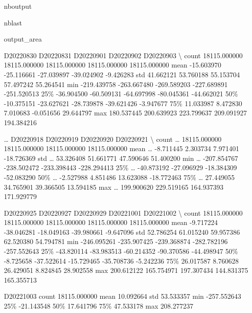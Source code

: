 \documentclass[letterpaper,10pt]{sphinxmanual}
\begin{document}
\begin{sphinxuseclass}{nboutput}
\begin{sphinxuseclass}{nblast}
{\begin{sphinxuseclass}{output_area}
\begin{sphinxuseclass}{}
\begin{sphinxVerbatim}[commandchars=\\\{\}]
          D20220830     D20220831     D20220901     D20220902     D20220903  \textbackslash{}
count  18115.000000  18115.000000  18115.000000  18115.000000  18115.000000
mean     -15.603970    -25.116661    -27.039897    -39.024902     -9.426283
std       41.662121     53.760188     55.153704     57.497242     55.264541
min     -219.439758   -263.667480   -269.589203   -227.689891   -251.520513
25\%      -36.904500    -60.509131    -64.697998    -80.045361    -44.662021
50\%      -10.375151    -23.627621    -28.739878    -39.621426     -3.947677
75\%       11.033987      8.472830      7.010683     -0.051656     29.644797
max      180.537445    200.639923    223.799637    209.091927    194.384216

       {\ldots}     D20220918     D20220919     D20220920     D20220921  \textbackslash{}
count  {\ldots}  18115.000000  18115.000000  18115.000000  18115.000000
mean   {\ldots}     -8.711445      2.303734      7.971401    -18.726369
std    {\ldots}     53.326408     51.661771     47.590646     51.400200
min    {\ldots}   -207.854767   -238.502472   -233.398443   -228.294413
25\%    {\ldots}    -40.873192    -27.096929    -18.384309    -52.083290
50\%    {\ldots}     -2.527988      4.851486     13.623088    -18.772463
75\%    {\ldots}     27.449055     34.765901     39.366505     13.594185
max    {\ldots}    199.900620    229.519165    164.937393    171.929779

          D20220925     D20220927     D20220929     D20221001     D20221002  \textbackslash{}
count  18115.000000  18115.000000  18115.000000  18115.000000  18115.000000
mean      -9.717224    -38.046281    -18.049163    -39.980661     -9.647096
std       52.786254     61.015240     59.957386     62.520380     54.794781
min     -246.095261   -235.907425   -239.368874   -282.782196   -257.552643
25\%      -43.820114    -83.983513    -60.214352    -90.370586    -44.498947
50\%       -8.725658    -37.522614    -15.729465    -35.708736     -5.242236
75\%       26.017587      8.760628     26.429051      8.824845     28.902558
max      200.612122    165.754971    197.307434    144.831375    165.355713

          D20221003
count  18115.000000
mean      10.092664
std       53.533357
min     -257.552643
25\%      -21.143548
50\%       17.641796
75\%       47.533178
max      208.277237


\end{sphinxVerbatim}
\end{sphinxuseclass}
\end{sphinxuseclass}}
\end{sphinxuseclass}
\end{sphinxuseclass}
\end{document}

